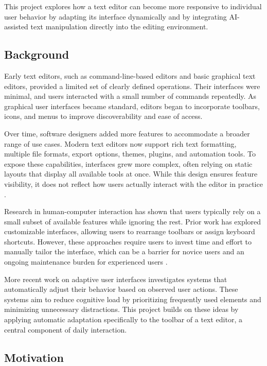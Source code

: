 \documentclass[sigconf]{acmart}
\begin{document}
This project explores how a text editor can become more responsive to individual user behavior by adapting its interface dynamically and by integrating AI-assisted text manipulation directly into the editing environment.

\subsection{Background}

Early text editors, such as command-line-based editors and basic graphical text editors, provided a limited set of clearly defined operations. Their interfaces were minimal, and users interacted with a small number of commands repeatedly. As graphical user interfaces became standard, editors began to incorporate toolbars, icons, and menus to improve discoverability and ease of access.

Over time, software designers added more features to accommodate a broader range of use cases. Modern text editors now support rich text formatting, multiple file formats, export options, themes, plugins, and automation tools. To expose these capabilities, interfaces grew more complex, often relying on static layouts that display all available tools at once. While this design ensures feature visibility, it does not reflect how users actually interact with the editor in practice \cite{Hamdani2025_AdaptiveHCI,Bieniek2024_GenAI_UX}.

Research in human-computer interaction has shown that users typically rely on a small subset of available features while ignoring the rest. Prior work has explored customizable interfaces, allowing users to rearrange toolbars or assign keyboard shortcuts. However, these approaches require users to invest time and effort to manually tailor the interface, which can be a barrier for novice users and an ongoing maintenance burden for experienced users \cite{Hamdani2025_AdaptiveHCI}.

More recent work on adaptive user interfaces investigates systems that automatically adjust their behavior based on observed user actions. These systems aim to reduce cognitive load by prioritizing frequently used elements and minimizing unnecessary distractions. This project builds on these ideas by applying automatic adaptation specifically to the toolbar of a text editor, a central component of daily interaction.

\subsection{Motivation}
\end{document}
